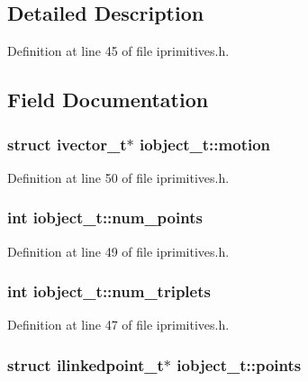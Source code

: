 \subsection{Detailed Description}


Definition at line 45 of file iprimitives.\-h.



\subsection{Field Documentation}
\hypertarget{structiobject__t_a95a087e73bb5b8d3fa5e2afd61a3a3c5}{
\subsubsection[{motion}]{\setlength{\rightskip}{0pt plus 5cm}struct {\bf ivector\-\_\-t}$\ast$ iobject\-\_\-t\-::motion}}\label{structiobject__t_a95a087e73bb5b8d3fa5e2afd61a3a3c5}


Definition at line 50 of file iprimitives.\-h.

\hypertarget{structiobject__t_a281441e3843f4753cd3893f750e78773}{
\subsubsection[{num\-\_\-points}]{\setlength{\rightskip}{0pt plus 5cm}int iobject\-\_\-t\-::num\-\_\-points}}\label{structiobject__t_a281441e3843f4753cd3893f750e78773}


Definition at line 49 of file iprimitives.\-h.

\hypertarget{structiobject__t_aa2cbae39b6848c1036afebae90a0bd8c}{
\subsubsection[{num\-\_\-triplets}]{\setlength{\rightskip}{0pt plus 5cm}int iobject\-\_\-t\-::num\-\_\-triplets}}\label{structiobject__t_aa2cbae39b6848c1036afebae90a0bd8c}


Definition at line 47 of file iprimitives.\-h.

\hypertarget{structiobject__t_aaf44cb85cf392a8ac7e30ab6971be2ad}{
\subsubsection[{points}]{\setlength{\rightskip}{0pt plus 5cm}struct {\bf ilinkedpoint\-\_\-t}$\ast$ iobject\-\_\-t\-::points}}\label{structiobject__t_aaf44cb85cf392a8ac7e30ab6971be2ad}


